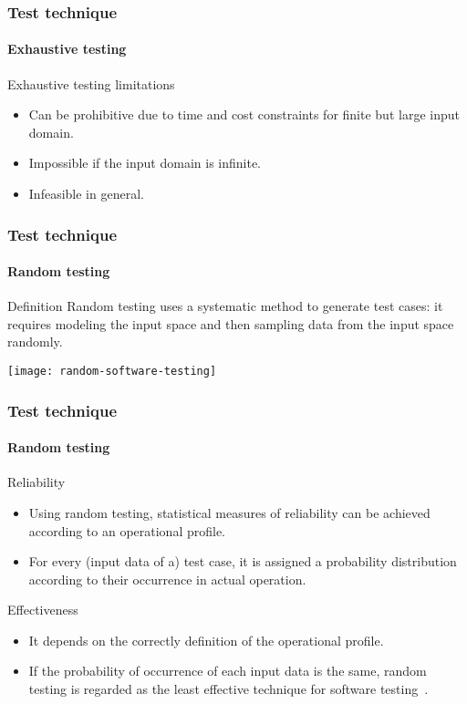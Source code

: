 \begin{frame}
\frametitle{Test technique}
\framesubtitle{Exhaustive testing}

\begin{block:fact}{Exhaustive testing limitations}
\begin{itemize}
	\item Can be prohibitive due to time and cost constraints for finite
	but large input domain.

	\item Impossible if the input domain is infinite.

	\item Infeasible in general.
\end{itemize}
\end{block:fact}
\end{frame}



\begin{frame}
\frametitle{Test technique}
\framesubtitle{Random testing}
\label{concept:random-testing}

\begin{block:concept}{Definition}
Random testing uses a systematic method to generate test cases: it
requires modeling the input space and then sampling data from the input
space randomly.
\end{block:concept}

\begin{block:fact}{}
    \centering
    \texttt{[image: random-software-testing]}
\end{block:fact}
\end{frame}


\begin{frame}
\frametitle{Test technique}
\framesubtitle{Random testing}

\begin{block:concept}{Reliability}
\begin{itemize}
	\item Using random testing, statistical measures of reliability can be
	achieved according to an operational profile.

	\item For every (input data of a) test case, it is assigned a probability
	distribution according to their occurrence in actual operation.
\end{itemize}
\end{block:concept}

\begin{block:fact}{Effectiveness}
\begin{itemize}
	\item It depends on the correctly definition of the operational profile.

	\item If the probability of occurrence of each input data is the same,
	random testing is regarded as the least effective technique for software
	testing~\cite[p. 43]{myers:2004}.
\end{itemize}

\end{block:fact}


\end{frame}


